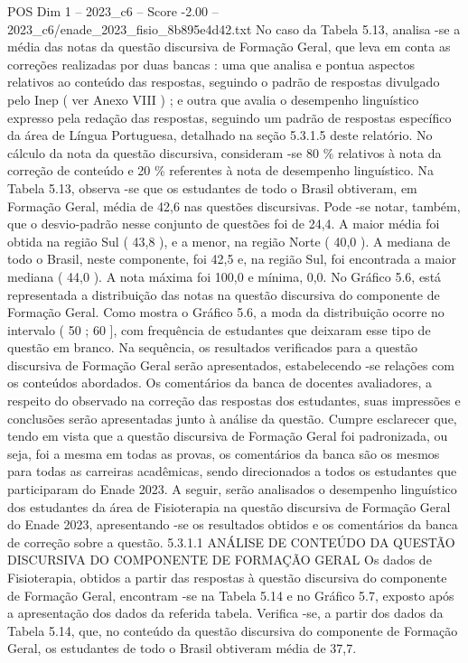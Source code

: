 \begin{textsample}{POS Dim 1 – 2023\_c6 – Score -2.00 – 2023\_c6/enade\_2023\_fisio\_8b895e4d42.txt}
No caso da Tabela 5.13, analisa -se a média das notas da questão discursiva de Formação Geral, que leva em conta as correções realizadas por duas bancas : uma que analisa e pontua aspectos relativos ao conteúdo das respostas, seguindo o padrão de respostas divulgado pelo Inep ( ver Anexo VIII ) ; e outra que avalia o desempenho linguístico expresso pela redação das respostas, seguindo um padrão de respostas específico da área de Língua Portuguesa, detalhado na seção 5.3.1.5 deste relatório.
No cálculo da nota da questão discursiva, consideram -se 80 \% relativos à nota da correção de conteúdo e 20 \% referentes à nota de desempenho linguístico.
Na Tabela 5.13, observa -se que os estudantes de todo o Brasil obtiveram, em Formação Geral, média de 42,6 nas questões discursivas.
Pode -se notar, também, que o desvio-padrão nesse conjunto de questões foi de 24,4.
A maior média foi obtida na região Sul ( 43,8 ), e a menor, na região Norte ( 40,0 ).
A mediana de todo o Brasil, neste componente, foi 42,5 e, na região Sul, foi encontrada a maior mediana ( 44,0 ).
A nota máxima foi 100,0 e mínima, 0,0.
No Gráfico 5.6, está representada a distribuição das notas na questão discursiva do componente de Formação Geral.
Como mostra o Gráfico 5.6, a moda da distribuição ocorre no intervalo ( 50 ; 60 ], com frequência de estudantes que deixaram esse tipo de questão em branco.
Na sequência, os resultados verificados para a questão discursiva de Formação Geral serão apresentados, estabelecendo -se relações com os conteúdos abordados.
Os comentários da banca de docentes avaliadores, a respeito do observado na correção das respostas dos estudantes, suas impressões e conclusões serão apresentadas junto à análise da questão.
Cumpre esclarecer que, tendo em vista que a questão discursiva de Formação Geral foi padronizada, ou seja, foi a mesma em todas as provas, os comentários da banca são os mesmos para todas as carreiras acadêmicas, sendo direcionados a todos os estudantes que participaram do Enade 2023.
A seguir, serão analisados o desempenho linguístico dos estudantes da área de Fisioterapia na questão discursiva de Formação Geral do Enade 2023, apresentando -se os resultados obtidos e os comentários da banca de correção sobre a questão. 5.3.1.1 ANÁLISE DE CONTEÚDO DA QUESTÃO DISCURSIVA DO COMPONENTE DE FORMAÇÃO GERAL Os dados de Fisioterapia, obtidos a partir das respostas à questão discursiva do componente de Formação Geral, encontram -se na Tabela 5.14 e no Gráfico 5.7, exposto após a apresentação dos dados da referida tabela.
Verifica -se, a partir dos dados da Tabela 5.14, que, no conteúdo da questão discursiva do componente de Formação Geral, os estudantes de todo o Brasil obtiveram média de 37,7.

\end{textsample}
